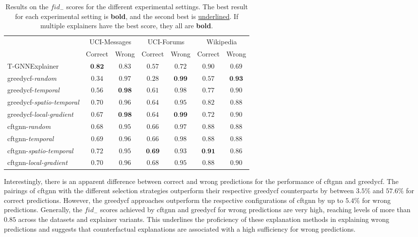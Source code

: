 \begin{table}[ht]
    \centering
    \small
    \begin{tabular}{lcccccc}
    \hline
         &  \multicolumn{2}{c}{UCI-Messages}&  \multicolumn{2}{c}{UCI-Forums}&  \multicolumn{2}{c}{Wikipedia}\\
         &  Correct&  Wrong&  Correct&  Wrong&  Correct& Wrong\\
         \hline
         T-GNNExplainer&  $\textbf{0.82}$&  $0.83$&  $0.57$&  $0.72$&  \underline{$0.90$}& $0.69$\\
         \gls{greedycf}-\textit{random}&  $0.34$&  $0.97$&  $0.28$&  $\textbf{0.99}$&  $0.57$& $\textbf{0.93}$\\
         \gls{greedycf}-\textit{temporal}&  $0.56$&  $\textbf{0.98}$&  $0.61$&  $0.98$&  $0.77$& $0.90$\\
         \gls{greedycf}-\textit{spatio-temporal}&  $0.70$&  $0.96$&  $0.64$&  $0.95$&  $0.82$& $0.88$\\
         \gls{greedycf}-\textit{local-gradient}&  $0.67$&  $\textbf{0.98}$&  $0.64$&  $\textbf{0.99}$&  $0.72$& $0.90$\\
         \gls{cftgnn}-\textit{random}&  $0.68$&  $0.95$&  $0.66$&  $0.97$&  $0.88$& $0.88$\\
         \gls{cftgnn}-\textit{temporal}&  $0.69$&  $0.96$&  $0.66$&  $0.98$&  $0.88$& $0.88$\\
         \gls{cftgnn}-\textit{spatio-temporal}&  \underline{$0.72$}&  $0.95$&  $\textbf{0.69}$&  $0.93$&  $\textbf{0.91}$& $0.86$\\
 \gls{cftgnn}-\textit{local-gradient}& $0.70$& $0.96$& \underline{$0.68$}& $0.95$& $0.88$&\underline{$0.90$}\\
 \hline
    \end{tabular}
    \caption{Results on the $fid_-$ scores for the different experimental settings. The best result for each experimental setting is \textbf{bold}, and the second best is \underline{underlined}. If multiple explainers have the best score, they all are \textbf{bold}.}
    \label{t_fid_minus}
\end{table}

Interestingly, there is an apparent difference between correct and wrong predictions for the performance of \gls{cftgnn} and \gls{greedycf}. The pairings of \gls{cftgnn} with the different selection strategies outperform their respective \gls{greedycf} counterparts by between $3.5\%$ and $57.6\%$ for correct predictions. However, the \gls{greedycf} approaches outperform the respective configurations of \gls{cftgnn} by up to $5.4\%$ for wrong predictions. Generally, the $fid_-$ scores achieved by \gls{cftgnn} and \gls{greedycf} for wrong predictions are very high, reaching levels of more than $0.85$ across the datasets and explainer variants. This underlines the proficiency of these explanation methods in explaining wrong predictions and suggests that counterfactual explanations are associated with a high sufficiency for wrong predictions.


